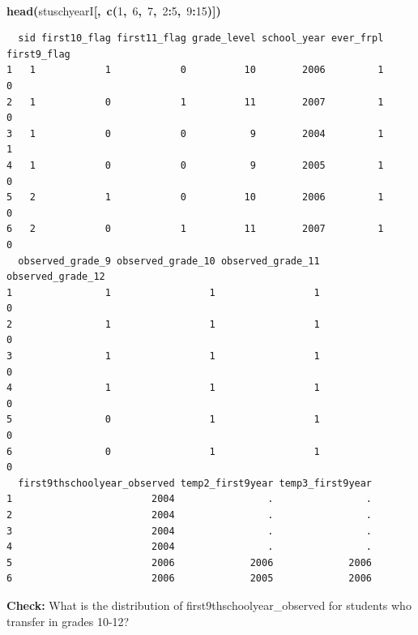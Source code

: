 \documentclass[12pt]{article}
\makeatletter
\newcommand{\hlnumber}[1]{\textcolor[rgb]{0,0,0}{#1}}%
\newcommand{\hlfunctioncall}[1]{\textcolor[rgb]{0.501960784313725,0,0.329411764705882}{\textbf{#1}}}%
\newcommand{\hlkeyword}[1]{\textcolor[rgb]{0,0,0}{\textbf{#1}}}%
\newcommand{\hlsymbol}[1]{\textcolor[rgb]{0,0,0}{#1}}%
\newcommand{\hlstd}[1]{\textcolor[rgb]{0,0,0}{#1}}%
\newenvironment{kframe}{%
 \def\FrameCommand##1{\hskip\@totalleftmargin \hskip-\fboxsep
 \colorbox{shadecolor}{##1}\hskip-\fboxsep
     \hskip-\linewidth \hskip-\@totalleftmargin \hskip\columnwidth}%
 \MakeFramed {\advance\hsize-\width
   \@totalleftmargin\z@ \linewidth\hsize
   \@setminipage}}%
 {\par\unskip\endMakeFramed}
\newenvironment{knitrout}{}{} %
\renewenvironment{knitrout}{\begin{footnotesize}}{\end{footnotesize}}
\makeatother
\begin{document}
\begin{knitrout}
\begin{kframe}
\begin{flushleft}
\hlstd{}\hspace*{\fill}\\
\hlstd{}\hlfunctioncall{head}\hlkeyword{(}\hlsymbol{stuschyearI}\hlkeyword{[}\hlkeyword{,}{\ }\hlfunctioncall{c}\hlkeyword{(}\hlnumber{1}\hlkeyword{,}{\ }\hlnumber{6}\hlkeyword{,}{\ }\hlnumber{7}\hlkeyword{,}{\ }\hlnumber{2}\hlkeyword{:}\hlnumber{5}\hlkeyword{,}{\ }\hlnumber{9}\hlkeyword{:}\hlnumber{15}\hlkeyword{)}\hlkeyword{]}\hlkeyword{)}\mbox{}
\normalfont
\end{flushleft}
\begin{verbatim}
  sid first10_flag first11_flag grade_level school_year ever_frpl first9_flag
1   1            1            0          10        2006         1           0
2   1            0            1          11        2007         1           0
3   1            0            0           9        2004         1           1
4   1            0            0           9        2005         1           0
5   2            1            0          10        2006         1           0
6   2            0            1          11        2007         1           0
  observed_grade_9 observed_grade_10 observed_grade_11 observed_grade_12
1                1                 1                 1                 0
2                1                 1                 1                 0
3                1                 1                 1                 0
4                1                 1                 1                 0
5                0                 1                 1                 0
6                0                 1                 1                 0
  first9thschoolyear_observed temp2_first9year temp3_first9year
1                        2004                .                .
2                        2004                .                .
3                        2004                .                .
4                        2004                .                .
5                        2006             2006             2006
6                        2006             2005             2006
\end{verbatim}
\end{kframe}
\end{knitrout}


\textbf{Check:} What is the distribution of first9thschoolyear\_observed for students who transfer in grades 10-12?
\end{document}
